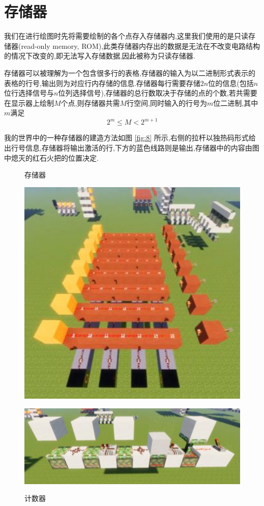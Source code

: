 \documentclass[UTF8,12pt,punct=kaiming,fontset=none]{ctexart}
\begin{document}
    \section{存储器}
    我们在进行绘图时先将需要绘制的各个点存入存储器内,这里我们使用的是只读存储器(read-only memory, ROM),此类存储器内存出的数据是无法在不改变电路结构的情况下改变的,即无法写入存储数据,因此被称为只读存储器.

    存储器可以被理解为一个包含很多行的表格,存储器的输入为以二进制形式表示的表格的行号,输出则为对应行内存储的信息.存储器每行需要存储$2 n$位的信息(包括$n$位行选择信号与$n$位列选择信号),存储器的总行数取决于存储的点的个数,若共需要在显示器上绘制$M$个点,则存储器共需$M$行空间,同时输入的行号为$m$位二进制,其中$m$满足
    $$2^m \leqslant M < 2^{m+1}$$

    我的世界中的一种存储器的建造方法如图 \ref{fig:8} 所示,右侧的拉杆以独热码形式给出行号信息,存储器将输出激活的行,下方的蓝色线路则是输出,存储器中的内容由图中熄灭的红石火把的位置决定.

    \begin{figure}[H]
        \begin{floatrow}
            \ffigbox
            {
                \caption{存储器}
                \label{fig:8}
            }
            {
                \includegraphics[width=0.5\linewidth]{figures/8.png}
            }
            \ffigbox
            {
                \caption{计数器}
                \label{fig:9}
            }
            {
                \includegraphics[width=\linewidth]{figures/9.png}
            }
        \end{floatrow}
    \end{figure}
\end{document}
